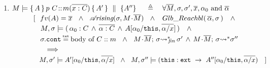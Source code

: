 {{\begin{definition}
\begin{enumerate}
  \item
 $\satisfies{M} { \mprepostN {A}{p\ C}{m}{x}{C}{A'} {A''} }\  \ \ \   \triangleq  \ \ \ \forall   \Mtwo,  \sigma, \sigma',  \overline{x}, \alpha_0 \mbox{ and }  \overline{\alpha}$    \\
$\strut   \ \ \ \  \  \ \ \ \  [ \ \ { fv(A)=\overline x \  \ \wedge \ \ \arising{\sigma}{M\madd \Mtwo }\   \  \wedge\ \ \GRelevant {\overline \alpha}  \sigma}\ \ \ \wedge \ \  $\\
$\strut    \ \ \ \  \  \ \ \ \ \  \ \ \satisfiesA {M}   {\sigma}  {(\, \alpha_0:C \, \wedge\, \overline {\alpha:C} \, \wedge\,  {A[\alpha_0/\prg{this},\overline{\alpha/x}]}\, ) } \ \ \ \wedge$\\
$\strut    \ \ \ \  \  \ \ \ \ \  \ \  \sigma.\prg{cont}\txteq \mbox{body of $C::m$} \ \ \wedge  \ \   {\leadstoBoundedStarFin {M\madd \Mtwo}{\sigma}  {\sigma'} }  \, \wedge  \, {\leadstoBoundedStar  {M\madd \Mtwo}{\sigma}  {\sigma''} } $\\
$\strut   \ \ \ \  \  \ \ \ \ \  \ \ \ \  \Longrightarrow   $\\
$\strut   \ \ \ \  \  \ \ \ \ \  \ \   {\satisfiesA{M}{\sigma'}{ A'[\alpha_0/\prg{this},\overline{\alpha/x}]} }\  \ \wedge  \ \ 
  {\satisfiesA{M}{\sigma''}{ ( \external{\prg{this}}\ \rightarrow\ A''[\alpha_0/\prg{this},\overline{\alpha/x}})}\ \  \ ] $


\end{enumerate}
\end{definition}}}
